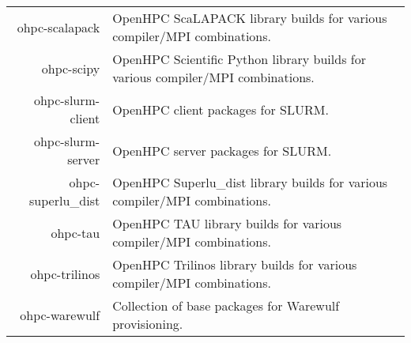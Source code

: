 \begin{tabularx}{\textwidth}{r|X}
ohpc-scalapack & OpenHPC ScaLAPACK library builds for various compiler/MPI combinations. \\ 
ohpc-scipy & OpenHPC Scientific Python library builds for various compiler/MPI combinations. \\ 
ohpc-slurm-client & OpenHPC client packages for SLURM. \\ 
ohpc-slurm-server & OpenHPC server packages for SLURM. \\ 
ohpc-superlu\_dist & OpenHPC Superlu\_dist library builds for various compiler/MPI combinations. \\ 
ohpc-tau & OpenHPC TAU library builds for various compiler/MPI combinations. \\ 
ohpc-trilinos & OpenHPC Trilinos library builds for various compiler/MPI combinations. \\ 
ohpc-warewulf & Collection of base packages for Warewulf provisioning. \\ 
\bottomrule
\end{tabularx}
